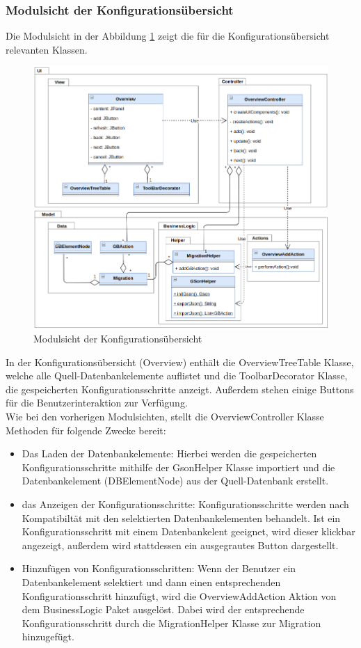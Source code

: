 	\subsubsection{Modulsicht der Konfigurationsübersicht}
	Die Modulsicht in der Abbildung \ref{img:modulsicht-overview} zeigt die für die Konfigurationsübersicht relevanten Klassen.
	\begin{figure}[H]
		\centering
		\includegraphics[width=\textwidth]{images/sichten/modulsicht-overview}
		\caption{Modulsicht der Konfigurationsübersicht}
		\label{img:modulsicht-overview}
	\end{figure}
	In der Konfigurationsübersicht (Overview) enthält die OverviewTreeTable Klasse, welche alle Quell-Datenbankelemente auflistet und die ToolbarDecorator Klasse, die gespeicherten Konfigurationsschritte anzeigt. Außerdem stehen einige Buttons für die Benutzerinteraktion zur Verfügung. \\
	Wie bei den vorherigen Modulsichten, stellt die OverviewController Klasse Methoden für folgende Zwecke bereit:
	\begin{itemize}
		\item Das Laden der Datenbankelemente: Hierbei werden die gespeicherten Konfigurationsschritte mithilfe der GsonHelper Klasse importiert und die Datenbankelement (DBElementNode) aus der Quell-Datenbank erstellt.
		\item das Anzeigen der Konfigurationsschritte: Konfigurationsschritte werden nach Kompatibiltät mit den selektierten Datenbankelementen behandelt. Ist ein Konfigurationsschritt mit einem Datenbankelent geeignet, wird dieser klickbar angezeigt, außerdem wird stattdessen ein ausgegrautes Button dargestellt.
		\item Hinzufügen von Konfigurationsschritten: Wenn der Benutzer ein Datenbankelement selektiert und dann einen entsprechenden Konfigurationsschritt hinzufügt, wird die OverviewAddAction Aktion von dem BusinessLogic Paket ausgelöst. Dabei wird der entsprechende Konfigurationsschritt durch die MigrationHelper Klasse zur Migration hinzugefügt.
	\end{itemize}
	

